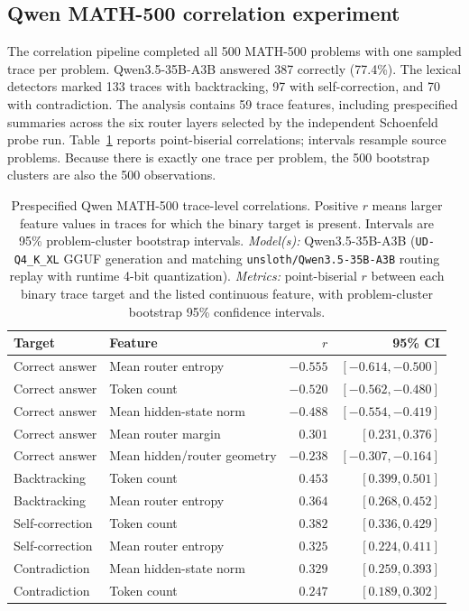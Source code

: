 \documentclass[manuscript,screen,review]{jair}
\newcommand{\modelmetrics}[2]{\textit{Model(s):} #1. \textit{Metrics:} #2.}
\begin{document}
\subsection{Qwen MATH-500 correlation experiment}

The correlation pipeline completed all 500 MATH-500 problems with one sampled
trace per problem.  Qwen3.5-35B-A3B answered 387 correctly (77.4\%).  The
lexical detectors marked 133 traces with backtracking, 97 with
self-correction, and 70 with contradiction.  The analysis contains 59 trace
features, including prespecified summaries across the six router layers
selected by the independent Schoenfeld probe run.  Table~\ref{tab:qwen-corr}
reports point-biserial correlations; intervals resample source problems.
Because there is exactly one trace per problem, the 500 bootstrap clusters are
also the 500 observations.

\begin{table}[t]
\centering
\caption{Prespecified Qwen MATH-500 trace-level correlations.  Positive $r$
means larger feature values in traces for which the binary target is present.
Intervals are 95\% problem-cluster bootstrap intervals.
\modelmetrics{Qwen3.5-35B-A3B (\texttt{UD-Q4\_K\_XL} GGUF generation and
matching \texttt{unsloth/Qwen3.5-35B-A3B} routing replay with runtime 4-bit
quantization)}{point-biserial $r$ between each binary trace target and the
listed continuous feature, with problem-cluster bootstrap 95\% confidence
intervals}}
\label{tab:qwen-corr}
\begin{tabular}{llrr}
\toprule
Target & Feature & $r$ & 95\% CI \\
\midrule
Correct answer & Mean router entropy & $-0.555$ & $[-0.614,-0.500]$ \\
Correct answer & Token count & $-0.520$ & $[-0.562,-0.480]$ \\
Correct answer & Mean hidden-state norm & $-0.488$ & $[-0.554,-0.419]$ \\
Correct answer & Mean router margin & $0.301$ & $[0.231,0.376]$ \\
Correct answer & Mean hidden/router geometry & $-0.238$ & $[-0.307,-0.164]$ \\
Backtracking & Token count & $0.453$ & $[0.399,0.501]$ \\
Backtracking & Mean router entropy & $0.364$ & $[0.268,0.452]$ \\
Self-correction & Token count & $0.382$ & $[0.336,0.429]$ \\
Self-correction & Mean router entropy & $0.325$ & $[0.224,0.411]$ \\
Contradiction & Mean hidden-state norm & $0.329$ & $[0.259,0.393]$ \\
Contradiction & Token count & $0.247$ & $[0.189,0.302]$ \\
\bottomrule
\end{tabular}
\end{table}
\end{document}
